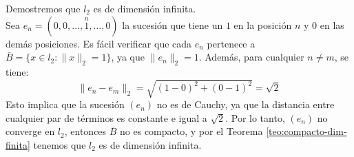 \begin{ejemplo}
    Demostremos que $l_2$ es de dimensión infinita. \\ 

    \noindent
    Sea $e_n=(0, 0, \dots, \overset{n}{1}, \dots, 0)$ la sucesión que tiene un $1$ en la posición $n$ y $0$ en las demás posiciones. Es fácil verificar que cada $e_n$ pertenece a $\bar{B} = \{x \in l_2 : \|x\|_2 = 1\}$, ya que $\|e_n\|_2 = 1$. Además, para cualquier $n \neq m$, se tiene:
    \begin{equation*}
        \|e_n - e_m\|_2 = \sqrt{(1-0)^2 + (0-1)^2} = \sqrt{2}
    \end{equation*}
    Esto implica que la sucesión $(e_n)$ no es de Cauchy, ya que la distancia entre cualquier par de términos es constante e igual a $\sqrt{2}$. Por lo tanto, $(e_n)$ no converge en $l_2$, entonces $\bar{B}$ no es compacto, y por el Teorema \ref{teo:compacto-dim-finita} tenemos que $l_2$ es de dimensión infinita.
\end{ejemplo}